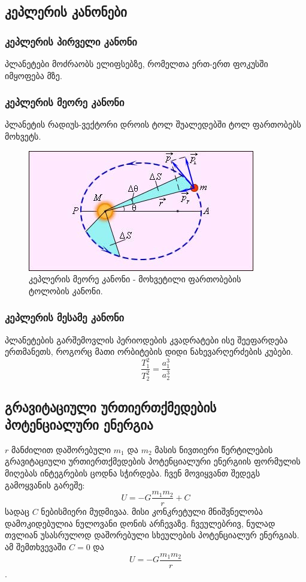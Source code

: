 \documentclass{book}
\begin{document}
\subsection{კეპლერის კანონები}%
\subsubsection{კეპლერის პირველი კანონი}
	პლანეტები მოძრაობს ელიფსებზე, რომელთა ერთ-ერთ ფოკუსში იმყოფება მზე.
\subsubsection{კეპლერის მეორე კანონი}
პლანეტის რადიუს-ვექტორი დროის ტოლ შუალედებში ტოლ ფართობებს მოხვეტს.
		\begin{figure}[H]
		   \centering
           \includegraphics[width=0.5\columnwidth]{figures/kepler_2_law}
           \caption{კეპლერის მეორე კანონი - მოხვეტილი ფართობების ტოლობის კანონი.}
           \label{fig:kepler_2_law}
        \end{figure}
	
\subsubsection{კეპლერის მესამე კანონი}
	პლანეტების გარშემოვლის პერიოდების კვადრატები ისე შეეფარდება ერთმანეთს, როგორც მათი ორბიტების დიდი ნახევარღერძების კუბები.
	\begin{equation}
		\frac{T_1^2}{T_2^2} = \frac{a_1^3}{a_2^3}
	\end{equation}
	
\subsection{გრავიტაციული ურთიერთქმედების პოტენციალური ენერგია}
	$r$ მანძილით დაშორებული $m_1$ და $m_2$ მასის ნივთიერი წერტილების გრავიტაციული ურთიერთქმედების პოტენციალური ენერგიის ფორმულის მიღებას ინტეგრების ცოდნა სჭირდება. ჩვენ მოვიყვანთ შედეგს გამოყვანის გარეშე:
	\begin{equation}
		U = -G\frac{m_1 m_2}{r} + C
	\end{equation}
სადაც $C$ ნებისმიერი მუდმივაა. მისი კონკრეტული მნიშვნელობა დამოკიდებულია ნულოვანი დონის არჩევაზე. ჩვეულებრივ, ნულად თვლიან
უსასრულოდ დაშორებული სხეულების პოტენციალურ ენერგიას. ამ შემთხვევაში	$C = 0$ და $$U = -G\frac{m_1 m_2}{r}$$.
	
\end{document}
